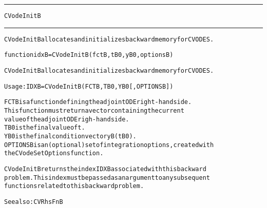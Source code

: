\begin{samepage}
\hrule
\begin{center}
{\large \verb!CVodeInitB!}
\label{p:CVodeInitB}
\end{center}
\hrule\vspace{0.1in}



\begin{alltt}
CVodeInitB allocates and initializes backward memory for CVODES.
\end{alltt}

\end{samepage}



\begin{samepage}


\begin{alltt}
function idxB = CVodeInitB(fctB, tB0, yB0, optionsB) 
\end{alltt}

\end{samepage}



\begin{alltt}
CVodeInitB allocates and initializes backward memory for CVODES.

   Usage:   IDXB = CVodeInitB ( FCTB, TB0, YB0 [, OPTIONSB] )

   FCTB     is a function defining the adjoint ODE right-hand side.
            This function must return a vector containing the current 
            value of the adjoint ODE righ-hand side.
   TB0      is the final value of t.
   YB0      is the final condition vector yB(tB0).  
   OPTIONSB is an (optional) set of integration options, created with
            the CVodeSetOptions function. 

   CVodeInitB returns the index IDXB associated with this backward
   problem. This index must be passed as an argument to any subsequent
   functions related to this backward problem.

   See also: CVRhsFnB
\end{alltt}






\vspace{0.1in}